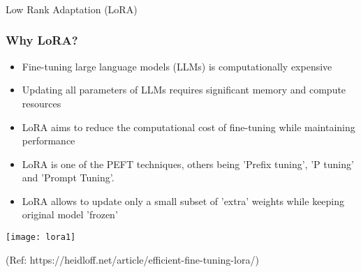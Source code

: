 


\begin{frame}[fragile]\frametitle{}
\begin{center}
{\Large Low Rank Adaptation (LoRA)}
\end{center}
\end{frame}

\begin{frame}[fragile]\frametitle{Why LoRA?}
\begin{itemize}
    \item Fine-tuning large language models (LLMs) is computationally expensive
    \item Updating all parameters of LLMs requires significant memory and compute resources
    \item LoRA aims to reduce the computational cost of fine-tuning while maintaining performance
	\item LoRA is one of the PEFT techniques, others being 'Prefix tuning', 'P tuning' and 'Prompt Tuning'.
	\item LoRA allows to update only a small subset of 'extra' weights while keeping original model 'frozen'
\end{itemize}

		\begin{center}
		\texttt{[image: lora1]}
		
		{\tiny (Ref: https://heidloff.net/article/efficient-fine-tuning-lora/)}
		\end{center}

\end{frame}

